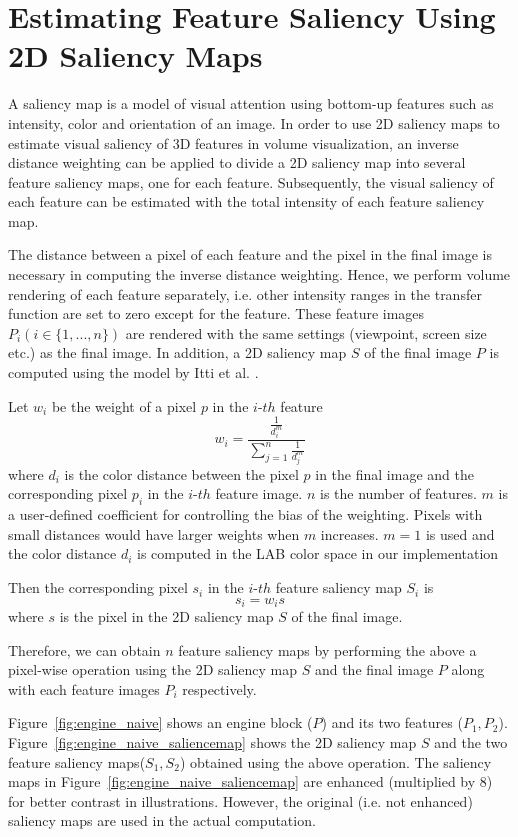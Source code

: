 \chapter{Estimating Feature Saliency Using 2D Saliency Maps \label{2d_saliency_map}}

A saliency map is a model of visual attention using bottom-up features such as intensity, color and orientation of an image.
In order to use 2D saliency maps \cite{itti_model_1998} to estimate visual saliency of 3D features in volume visualization, an inverse distance weighting \cite{shepard_two-dimensional_1968} can be applied to divide a 2D saliency map into several feature saliency maps, one for each feature. Subsequently, the visual saliency of each feature can be estimated with the total intensity of each feature saliency map.

The distance between a pixel of each feature and the pixel in the final image is necessary in computing the inverse distance weighting.
Hence, we perform volume rendering of each feature separately, i.e. other intensity ranges in the transfer function are set to zero except for the feature.
These feature images $ P_{i} (i \in \{1,...,n\})$ are rendered with the same settings (viewpoint, screen size etc.) as the final image.
In addition, a 2D saliency map $ S $ of the final image $ P $ is computed using the model by Itti et al. \cite{itti_model_1998}.

Let $ w_{i} $ be the weight of a pixel $ p $ in the $i$-$th$ feature
\[ w_{i} = \frac{ \frac{1}{d_{i}^{m}} }{ \sum_{j=1}^{n} \frac{1}{d_{j}^{m}} } \]
where $ d_{i} $ is the color distance between the pixel $ p $ in the final image and the corresponding pixel $ p_{i} $ in the $i$-$th$ feature image.
$ n $ is the number of features.
$ m $ is a user-defined coefficient for controlling the bias of the weighting. Pixels with small distances would have larger weights when $ m $ increases. $ m=1 $ is used and the color distance $ d_{i} $ is computed in the LAB color space in our implementation

Then the corresponding pixel $ s_{i} $ in the $i$-$th$  feature saliency map $ S_{i} $ is
\[ s_{i}=w_{i}s \]
where $ s $ is the pixel in the 2D saliency map $ S $ of the final image.

Therefore, we can obtain $ n $ feature saliency maps by performing the above a pixel-wise operation using the 2D saliency map $ S $ and the final image $ P $ along with each feature images $ P_{i} $ respectively.

Figure~\ref{fig:engine_naive} shows an engine block ($ P $) and its two features ($ P_{1} , P_{2} $).
Figure~\ref{fig:engine_naive_saliencemap} shows the 2D saliency map $ S $ and the two feature saliency maps($ S_{1} , S_{2} $) obtained using the above operation.
The saliency maps in Figure~\ref{fig:engine_naive_saliencemap} are enhanced (multiplied by 8) for better contrast in illustrations. However, the original (i.e. not enhanced) saliency maps are used in the actual computation.

